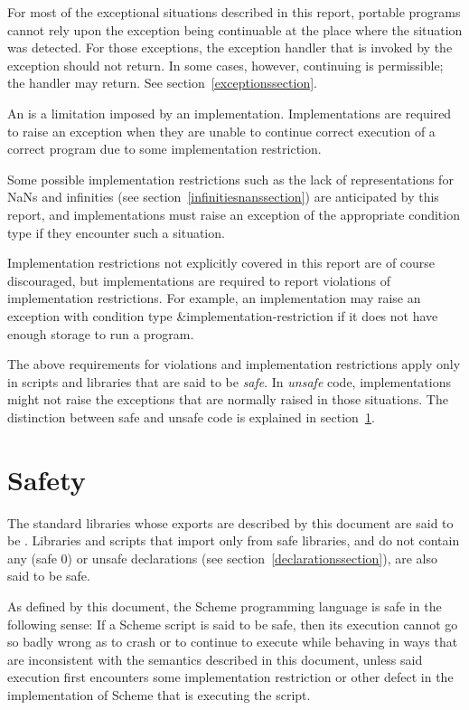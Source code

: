 For most of the exceptional situations described in this report,
portable programs cannot rely upon the exception being continuable
at the place where the situation was detected.
For those exceptions, the exception handler that is invoked by the
exception should not return.
In some cases, however, continuing is permissible; the
handler may return.  See section~\ref{exceptionssection}.

An  is a limitation imposed
by an implementation.  Implementations are required to raise an
exception when they are unable to continue correct execution of
a correct program due to some implementation restriction.

Some possible implementation restrictions
such as the lack of representations for NaNs and infinities (see
section~\ref{infinitiesnanssection}) are anticipated by this report,
and implementations must raise an exception of the appropriate
condition type if they encounter such a situation.

Implementation restrictions not explicitly covered in this report are
of course discouraged, but implementations are required to report
violations of implementation restrictions.
For example, an implementation may raise an exception
with condition type {\cf\&implementation-restriction} if it does not
have enough storage to run a program.

The above requirements for violations and implementation restrictions
apply only in scripts and libraries that are said to be \textit{safe}.
In \textit{unsafe} code, implementations might not raise the
exceptions that are normally raised in those situations.  The
distinction between safe and unsafe code is explained in
section~\ref{safeunsafemodesection}.

\section{Safety}
\label{safeunsafemodesection}

The standard libraries whose exports are described by this document
are said to be .  Libraries and scripts
that import only
from safe libraries, and do not contain any {\cf (safe 0)} or
{\cf unsafe} declarations (see section~\ref{declarationssection}),
are also said to be safe.

As defined by this document, the Scheme programming language
is safe in the following sense:
If a Scheme script is said to be safe, then its execution
cannot go so badly wrong as to crash or to continue to
execute while behaving in ways that are
inconsistent with the semantics described in this document,
unless said execution first encounters some implementation
restriction or other defect in the implementation of Scheme
that is executing the script.

